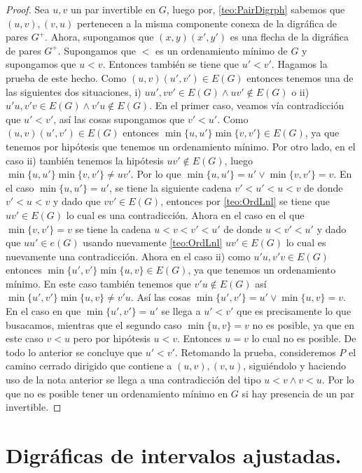 \begin{proof}
    Sea $u,v$ un par invertible en $G$, luego por, \cref{teo:PairDigrph} sabemos que $(u,v),(v,u)$ pertenecen a la misma componente conexa de la digráfica de pares $G^+$. 
    Ahora, supongamos que $(x,y)(x', y')$ es una flecha de la digráfica de pares $G^+$. Supongamos que $<$ es un ordenamiento mínimo de $G$ y supongamos que $ u < v$. Entonces también se tiene que $u'< v'$. Hagamos la prueba de este hecho. Como $(u,v)(u',v')\in E(G)$ entonces tenemos una de las siguientes dos situaciones, i) $uu', vv'\in E(G) \wedge uv'\notin E(G) $ o ii) $u'u, v'v \in E(G) \wedge v'u\notin E(G) $. En el primer caso, veamos vía contradicción que $u'<v'$, así las cosas supongamos que $v'<u'$. Como $(u,v)(u',v')\in E(G)$ entonces $\min \{u,u' \}\min \{v,v' \}\in E(G)$, ya que tenemos por hipótesis que tenemos un ordenamiento mínimo. Por otro lado, en el caso ii) también tenemos la hipótesis $uv'\notin E(G)$, luego $\min \{u,u' \}\min \{v,v' \} \neq uv'$. Por lo que $\min \{u,u' \}=u' \vee \min \{v,v' \}= v$. En el caso $\min \{u,u' \}=u'$, se tiene la siguiente cadena $v'<u'<u<v$ de donde $v'<u<v$ y dado que $vv'\in E(G)$, entonces por \cref{teo:OrdLnl} se tiene que $uv'\in E(G)$ lo cual es una contradicción. Ahora en el caso en el que $\min \{v,v' \}= v$ se tiene la cadena $u<v<v'<u'$ de donde $u<v'<u'$ y dado que $uu'\in e(G)$ usando nuevamente \cref{teo:OrdLnl} $uv' \in E(G)$ lo cual es nuevamente una contradicción. Ahora en el caso ii) como $u'u, v'v \in E(G)$ entonces $\min \{u',v' \}\min \{u,v \}\in E(G)$, ya que tenemos un ordenamiento mínimo. En este caso también tenemos que $v'u\notin E(G)$ así $\min \{u',v' \}  \min \{u,v \}\neq v'u$. Así las cosas $\min \{u',v' \}=u' \vee \min \{u,v \}=v$. En el caso en que $\min \{u',v' \}=u'$ se llega a $u'<v'$ que es precisamente lo que busacamos, mientras que el segundo caso $\min \{u,v \}=v$ no es posible, ya que en este caso $v<u$ pero por hipótesis $u<v$. Entonces $u = v$ lo cual no es posible. De todo lo anterior se concluye que $u'<v'$.    
    Retomando la prueba, consideremos $P$ el camino cerrado dirigido que contiene a $(u,v),(v,u)$, siguiéndolo y haciendo uso de la nota anterior se llega a una contradicción del tipo $u<v \wedge v<u$.
    Por lo que no es posible tener un ordenamiento mínimo en $G$ si hay presencia de un par invertible.
\end{proof}

\section{Digráficas de intervalos ajustadas.}

